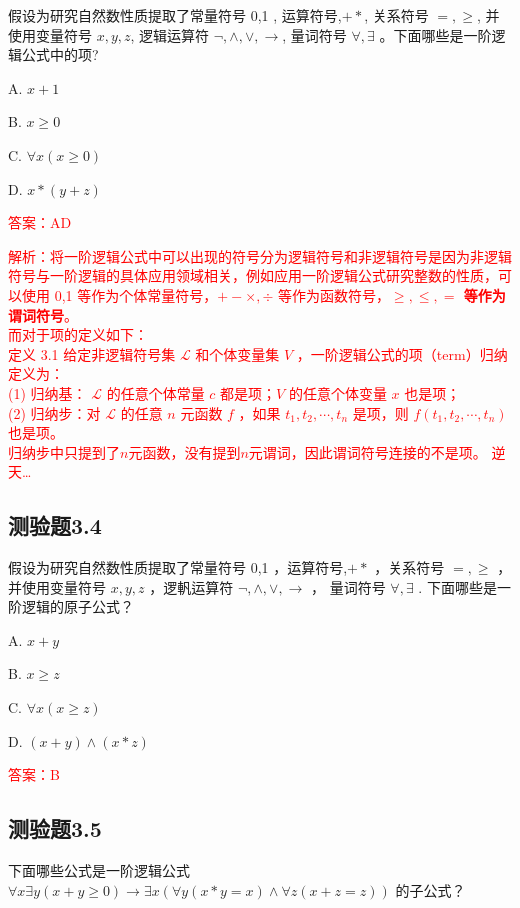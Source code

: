 \documentclass[UTF8, heading=true]{ctexart}
\begin{document}
假设为研究自然数性质提取了常量符号 0,1 , 运算符号,$+ *$,
 关系符号 $=, \geq$, 并使用变量符号 $x, y, z$, 
 逻辑运算符 $\neg, \wedge, \vee, \rightarrow$, 量词符号 $\forall, \exists$ 。下面哪些是一阶逻辑公式中的项?

A. $ x+1$

B. $ x \geq 0$

C. $\forall x(x \geq 0)$

D. $ x *(y+z)$

\textcolor{red}{答案：AD}

\textcolor{red}{解析：将一阶逻辑公式中可以出现的符号分为逻辑符号和非逻辑符号是因为非逻辑符号与一阶逻辑的具体应用领域相关，例如应用一阶逻辑公式研究整数的性质，可以使用 0,1 等作为个体常量符号，$+- \times, \div$ 等作为函数符号，\textbf{$\geq, \leq,=$ 等作为谓词符号}。\\ 而对于项的定义如下：\\ \indent 定义 3.1 给定非逻辑符号集 $\mathcal{L}$ 和个体变量集 $V$ ，一阶逻辑公式的项（term）归纳定义为：
\\ \indent (1) 归纳基： $\mathcal{L}$ 的任意个体常量 $c$ 都是项；$V$ 的任意个体变量 $x$ 也是项；
\\ \indent (2) 归纳步：对 $\mathcal{L}$ 的任意 $n$ 元函数 $f$ ，如果 $t_1, t_2, \cdots, t_n$ 是项，则 $f\left(t_1, t_2, \cdots, t_n\right)$ 也是项。
\\ \indent 归纳步中只提到了$n$元函数，没有提到$n$元谓词，因此谓词符号连接的不是项。 逆天\dots}

\subsection{测验题3.4}

假设为研究自然数性质提取了常量符号 0,1 ，运算符号,$+ *$ ，关系符号 $=, \geq$ ，
并使用变量符号 $x, y, z$ ，逻軓运算符 $\neg, \wedge, \vee, \rightarrow$ ，
量词符号 $\forall, \exists$ . 下面哪些是一阶逻辑的原子公式？

A. $ x+y$

B. $ x \geq z$

C. $\forall x(x \geq z)$

D. $(x+y) \wedge(x * z)$

\textcolor{red}{答案：B}

\subsection{测验题3.5}

下面哪些公式是一阶逻辑公式 $\forall x \exists y(x+y \geq 0) \rightarrow \exists x(\forall y(x * y=x) \wedge \forall z(x+z=z))$ 的子公式？
\end{document}
